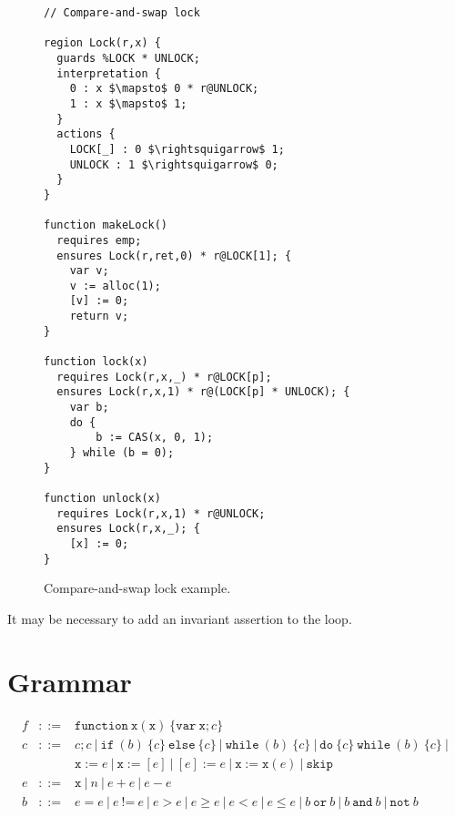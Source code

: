 \documentclass[a4paper]{article}
\begin{document}
\begin{figure}
\begin{center}
\begin{lstlisting}[language=caper,mathescape,columns=flexible]
// Compare-and-swap lock

region Lock(r,x) {
  guards %LOCK * UNLOCK;
  interpretation {
    0 : x $\mapsto$ 0 * r@UNLOCK;
    1 : x $\mapsto$ 1;
  }
  actions {
    LOCK[_] : 0 $\rightsquigarrow$ 1;
    UNLOCK : 1 $\rightsquigarrow$ 0;
  }
}

function makeLock()
  requires emp;
  ensures Lock(r,ret,0) * r@LOCK[1]; {
    var v;
    v := alloc(1);
    [v] := 0;
    return v;
}

function lock(x)
  requires Lock(r,x,_) * r@LOCK[p];
  ensures Lock(r,x,1) * r@(LOCK[p] * UNLOCK); {
    var b;
    do {
        b := CAS(x, 0, 1);
    } while (b = 0);
}

function unlock(x)
  requires Lock(r,x,1) * r@UNLOCK;
  ensures Lock(r,x,_); {
    [x] := 0;
}
\end{lstlisting}
\end{center}
\caption{Compare-and-swap lock example.}
\label{fig:caslock}
\end{figure}

It may be necessary to add an invariant assertion to the loop.

\section{Grammar}

\[
\begin{array}{rcl}
  f & ::= & \mathtt{function} \ \mathtt{x}(\mathtt{x}) \ \{ \mathtt{var} \ \mathtt{x} ; c \} \\
  c & ::= & c ; c \ | \ \mathtt{if} \ (b) \ \{ c \} \ \mathtt{else} \ \{ c \} \ | \ \mathtt{while} \ (b) \ \{ c \} \ | \ \mathtt{do} \ \{ c \} \ \mathtt{while} \ (b) \ \{ c \} \ | \ \\
   & & \mathtt{x} := e \ | \ \mathtt{x} := [e] \ | \ [e] := e \ | \ \mathtt{x} := \mathtt{x}(e) \ | \ \mathtt{skip} \\
  e & ::= & \mathtt{x} \ | \ n \ | \ e + e \ | \ e - e \ \\
  b & ::= & e = e \ | \ e \ \text{!=} \ e \ | \ e > e \ | \ e \ge e \ | \ e < e \ | \ e \le e \ | \ b \ \mathtt{or} \ b \ | \ b \ \mathtt{and} \ b \ | \ \mathtt{not} \ b
\end{array}
\]
\end{document}
